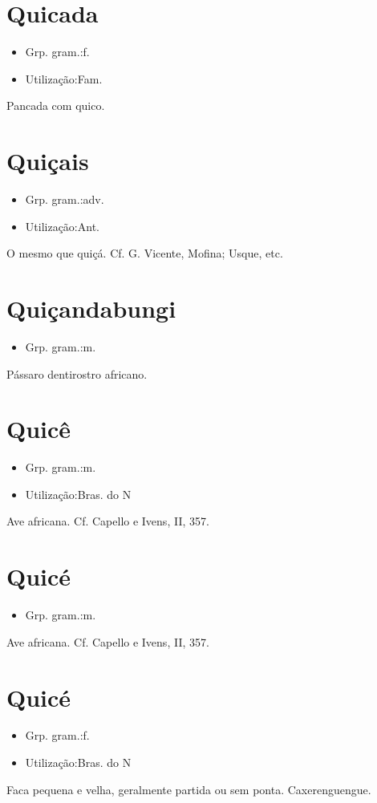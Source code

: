 \section{Quicada}
\begin{itemize}
\item {Grp. gram.:f.}
\end{itemize}
\begin{itemize}
\item {Utilização:Fam.}
\end{itemize}
Pancada com quico.
\section{Quiçais}
\begin{itemize}
\item {Grp. gram.:adv.}
\end{itemize}
\begin{itemize}
\item {Utilização:Ant.}
\end{itemize}
O mesmo que \textunderscore quiçá\textunderscore . Cf. G. Vicente, \textunderscore Mofina\textunderscore ; Usque, etc.
\section{Quiçandabungi}
\begin{itemize}
\item {Grp. gram.:m.}
\end{itemize}
Pássaro dentirostro africano.
\section{Quicê}
\begin{itemize}
\item {Grp. gram.:m.}
\end{itemize}
\begin{itemize}
\item {Utilização:Bras. do N}
\end{itemize}
Ave africana. Cf. Capello e Ivens, II, 357.
\section{Quicé}
\begin{itemize}
\item {Grp. gram.:m.}
\end{itemize}
Ave africana. Cf. Capello e Ivens, II, 357.
\section{Quicé}
\begin{itemize}
\item {Grp. gram.:f.}
\end{itemize}
\begin{itemize}
\item {Utilização:Bras. do N}
\end{itemize}
Faca pequena e velha, geralmente partida ou sem ponta.
Caxerenguengue.
